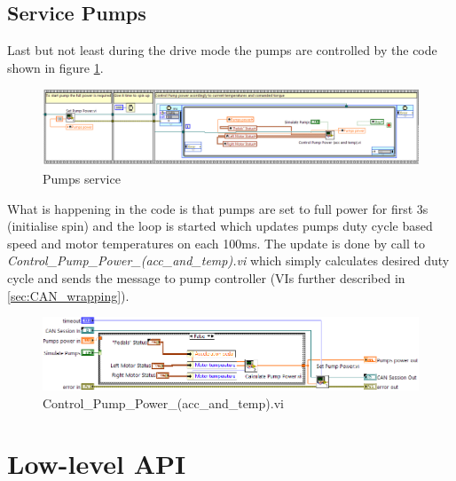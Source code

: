 \subsection{Service Pumps}
Last but not least during the drive mode the pumps are controlled by the code shown in figure \ref{pumps_service}.
\begin{figure}[H]
    \centering
    \includegraphics[scale=\visc,max width=\textwidth]{figures/Pumps}
    \caption{Pumps service}
    \label{pumps_service}
\end{figure}
What is happening in the code is that pumps are set to full power for first 3s (initialise spin) and the loop is started which updates pumps duty cycle based speed and motor temperatures on each 100ms.
The update is done by call to \textit{Control\_Pump\_Power\-\_(acc\_and\_temp).vi} which simply calculates desired duty cycle and sends the message to pump controller (VIs further described in \ref{sec:CAN_wrapping}).
\begin{figure}[H]
    \centering
    \includegraphics[scale=\visc,max width=\textwidth]{figures/Control_Pump_Power_(acc_and_temp)d_e}
    \caption{Control\_Pump\_Power\_(acc\_and\_temp).vi}
    \label{vi:Control_Pump_Power_(acc_and_temp)}
\end{figure}

\section{ Low-level API}
